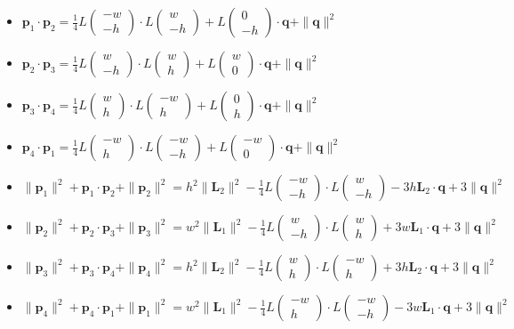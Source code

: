 \documentclass[10pt]{report}
\newcommand{\mat}[1]{\begin{pmatrix} #1 \end{pmatrix}}
\begin{document}
\begin{itemize}
\item $\boldsymbol{p}_1\cdot\boldsymbol{p}_2=\frac{1}{4}L\mat{-w\\-h}\cdot L\mat{w\\-h}+L\mat{0\\-h}\cdot\boldsymbol{q}+\|\boldsymbol{q}\|^2$
\item $\boldsymbol{p}_2\cdot\boldsymbol{p}_3=\frac{1}{4}L\mat{w\\-h}\cdot L\mat{w\\h}+L\mat{w\\0}\cdot\boldsymbol{q}+\|\boldsymbol{q}\|^2$
\item $\boldsymbol{p}_3\cdot\boldsymbol{p}_4=\frac{1}{4}L\mat{w\\h}\cdot L\mat{-w\\h}+L\mat{0\\h}\cdot\boldsymbol{q}+\|\boldsymbol{q}\|^2$
\item $\boldsymbol{p}_4\cdot\boldsymbol{p}_1=\frac{1}{4}L\mat{-w\\h}\cdot L\mat{-w\\-h}+L\mat{-w\\0}\cdot\boldsymbol{q}+\|\boldsymbol{q}\|^2$
\end{itemize}
\begin{itemize}
\item $\|\boldsymbol{p}_1\|^2+\boldsymbol{p}_1\cdot\boldsymbol{p}_2+\|\boldsymbol{p}_2\|^2=h^2\|\boldsymbol{L}_2\|^2-\frac{1}{4}L\mat{-w\\-h}\cdot L\mat{w\\-h}-3h\boldsymbol{L}_2\cdot\boldsymbol{q}+3\|\boldsymbol{q}\|^2$
\item $\|\boldsymbol{p}_2\|^2+\boldsymbol{p}_2\cdot\boldsymbol{p}_3+\|\boldsymbol{p}_3\|^2=w^2\|\boldsymbol{L}_1\|^2-\frac{1}{4}L\mat{w\\-h}\cdot L\mat{w\\h}+3w\boldsymbol{L}_1\cdot\boldsymbol{q}+3\|\boldsymbol{q}\|^2$
\item $\|\boldsymbol{p}_3\|^2+\boldsymbol{p}_3\cdot\boldsymbol{p}_4+\|\boldsymbol{p}_4\|^2=h^2\|\boldsymbol{L}_2\|^2-\frac{1}{4}L\mat{w\\h}\cdot L\mat{-w\\h}+3h\boldsymbol{L}_2\cdot\boldsymbol{q}+3\|\boldsymbol{q}\|^2$
\item $\|\boldsymbol{p}_4\|^2+\boldsymbol{p}_4\cdot\boldsymbol{p}_1+\|\boldsymbol{p}_1\|^2=w^2\|\boldsymbol{L}_1\|^2-\frac{1}{4}L\mat{-w\\h}\cdot L\mat{-w\\-h}-3w\boldsymbol{L}_1\cdot\boldsymbol{q}+3\|\boldsymbol{q}\|^2$
\end{itemize}
\end{document}
